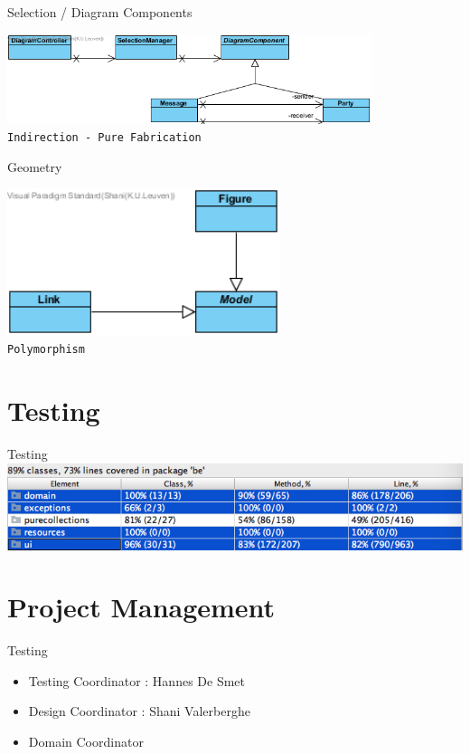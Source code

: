 \documentclass[10pt]{beamer}
\begin{document}
\begin{frame}[fragile]{Selection / Diagram Components}
\begin{center}
\includegraphics[width=0.8\textwidth]{diagram4}
\vspace{0.5cm}\\\texttt{Indirection - Pure Fabrication}
\end{center}
\end{frame}

\begin{frame}[fragile]{Geometry}
	\begin{center}
	\includegraphics[width=0.6\textwidth]{diagram5}
	\vspace{0.5cm}\\\texttt{Polymorphism}
	\end{center}
\end{frame}

\section{Testing}

\begin{frame}[fragile]{Testing}
\includegraphics[width=1\textwidth]{coverage}
\end{frame}

\section{Project Management}

\begin{frame}[fragile]{Testing}
\begin{itemize}
\item Testing Coordinator : Hannes De Smet
\item Design Coordinator : Shani Valerberghe
\item Domain Coordinator
\end{itemize}
\end{frame}

\end{document}
